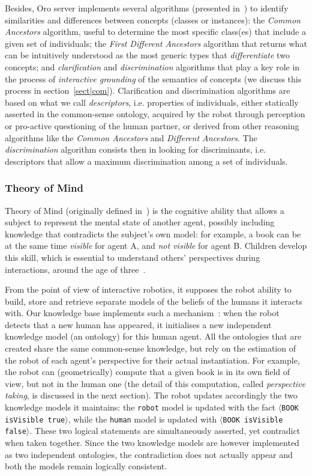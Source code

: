 \documentclass[preprint,3p,times]{elsarticle}
\newcommand{\concept}[1]{{\small \texttt{#1}}}
\newcommand{\stmt}[1]{{\footnotesize\tt$\langle$#1\relax$\rangle$}}
\newcommand{\ie}{i.e.\xspace}
\begin{document}
Besides, {\sc Oro} server implements several algorithms (presented
in~\cite{Ros2010b}) to identify
similarities and differences between concepts (classes or
instances): the \emph{Common Ancestors} algorithm, useful to
determine the most specific class(es) that include a given set of individuals;
the \emph{First Different Ancestors} algorithm that returns what can be
intuitively understood as the most generic types that \emph{differentiate} two
concepts; and \emph{clarification} and \emph{discrimination} algorithms that
play a key role in the process of \emph{interactive grounding} of the semantics
of concepts (we discuss this process in section~\ref{sect|com}). Clarification
and discrimination algorithms are based on what we call \emph{descriptors}, \ie
properties of individuals, either statically asserted in the common-sense
ontology, acquired by the robot through perception or pro-active questioning of
the human partner, or derived from other reasoning algorithms like the
\emph{Common Ancestors} and \emph{Different Ancestors}. The
\emph{discrimination} algorithm consists then in looking for discriminants, \ie
descriptors that allow a maximum discrimination among a set of individuals.

\subsubsection{Theory of Mind}
\label{sect|tom}

Theory of Mind (originally defined in~\cite{Premack1978}) is the cognitive
ability that allows a subject to represent the mental state of another
agent, possibly including knowledge that contradicts the subject's own model: for
example, a book can be at the same time \emph{visible} for agent A, and \emph{not
visible} for agent B. Children develop this skill, which is essential to understand others' perspectives during
interactions, around the age of three~\cite{perner2012infants}. 

From the point of view of interactive robotics, it supposes the robot ability to
build, store and retrieve separate models of the beliefs of the humans it
interacts with.  Our knowledge base implements such a
mechanism~\cite{Lemaignan2010}: when the robot
detects that a new human has appeared, it initialises a new independent
knowledge model (an ontology) for this human agent. All the ontologies that are
created share the same common-sense knowledge, but rely on the estimation of the
robot of each agent's perspective for their actual instantiation. For example,
the robot can (geometrically) compute that a given book is in its own field of view,
but not in the human one (the detail of this computation, called
\emph{perspective taking}, is discussed in the next section). The robot updates
accordingly the two knowledge models it maintains: the \concept{robot} model is
updated with the fact \stmt{BOOK isVisible true}, while the \concept{human}
model is updated with \stmt{BOOK isVisible false}. These two logical statements
are simultaneously asserted, yet contradict when taken together. Since the two
knowledge models are however implemented as two independent ontologies, the contradiction
does not actually appear and both the models remain logically consistent.
\end{document}
